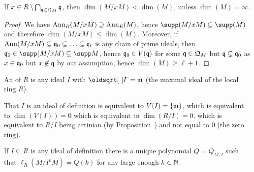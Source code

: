 \documentclass[a4paper,parskip=half,numbers=enddot, DIV=12]{scrreprt}
\begin{document}
\begin{fact}
    If $x\in R\setminus\bigcap_{\mathfrak{q}\in \mathfrak{Q}_M}\mathfrak{q}$, then $\dim(M/x M) <\dim(M)$, unless $\dim(M) =\infty$.
\end{fact}
\begin{proof}
    We have $\operatorname{Ann}_R(M/x M) \supseteq \operatorname{Ann}_R(M)$, hence $\supp (M/x M) \subseteq \supp (M)$ and therefore $\dim(M/x M) \leq \dim(M)$. Moreover, if $\operatorname{Ann}(M/x M) \subseteq \mathfrak{q}_0 \subsetneq \ldots \subsetneq \mathfrak{q}_\ell$ is any chain of prime ideals, then $\qq_0 \in \supp(M/x M)\subseteq \supp M$, hence $\mathfrak{q}_0\in V(\mathfrak{q})$ for some $\mathfrak{q}\in \mathfrak{Q}_M$ but $\mathfrak{q}\subsetneq \mathfrak{q}_0$ as $x\in \mathfrak{q}_0$ but $x\not\in \mathfrak{q}$ by our assumption, hence $\dim(M)\geq \ell+1$.
\end{proof}
\begin{defi}
    An  of $R$ is any ideal $I$ with $\sqrt{I} = \mm$ (the maximal ideal of the local ring $R$).
\end{defi}
\begin{rem*}
    That $I$ is an ideal of definition is equivalent to $V(I) = \{\mathfrak{m}\}$, which is equivalent to $\dim(V(I)) = 0$ which is equivalent to $\dim(R/I ) = 0$, which is equivalent to $R/I$ being artinian (by Proposition~) and not equal to $0$ (the zero ring).
\end{rem*}
\begin{fact}
    If $I\subseteq R$ is any ideal of definition there is a unique polynomial $Q= Q_{M,I}$ such that $\ell_R(M/I^kM) = Q(k)$ for any large enough $k\in \mathbb{N}$.
\end{fact}
\end{document}
